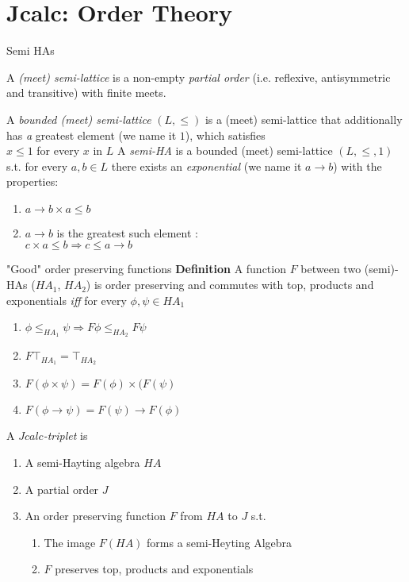 \documentclass{beamer}
\begin{document}
\section{Jcalc: Order Theory}
\begin{frame}{Semi HAs}
  \begin{outline}
  \1 A \textit{(meet) semi-lattice} is a non-empty \emph{partial order} 
  (i.e. reflexive, antisymmetric and transitive) 
  with finite meets.
  
 \1
  A \textit{bounded (meet) semi-lattice} $(L,\le)$ is a (meet) 
  semi-lattice that additionally has 
  \2 \emph a {greatest element} (we name it $1$), which satisfies\\
  $x \le 1$ for every $x$ in $L$  
 \1 A \textit{semi-HA} is a bounded (meet) semi-lattice $(L,\le, 1)$ 
 s.t. for every $a,b\in L$ there exists an \textit{exponential} 
 (we name it $a\rightarrow b$) 
 with the properties: 
 \begin{enumerate}
 \item $a\rightarrow b\times a\le b $
 \item $a\rightarrow b$ is the greatest such element : \\ $c\times a\le b \Longrightarrow c\le a\rightarrow b $
 \end{enumerate}
  \end{outline}
\end{frame}
\begin{frame}{"Good" order preserving functions}
  \textbf{Definition}
  A function $F$ between two (semi)-HAs ($HA_1$, $HA_2$)
   is order preserving
  and commutes with top, products and exponentials \emph{iff} for every 
  $\phi,\psi \in HA_1$
    \begin{enumerate}
    \item $\phi\le_{HA_1}\psi\Rightarrow F\phi\le_{HA_2}F\psi$
    \item $F\top_{HA_1} = \top_{HA_2}$ 
    \item{$F(\phi \times\psi) = F(\phi)\times(F(\psi)$} 
    \item $F(\phi\rightarrow \psi) = F(\psi)\rightarrow F(\phi)$
    \end{enumerate}
    A \emph{$Jcalc$-triplet} is 
    
  \begin{enumerate}
  \item A semi-Hayting algebra $HA$
  \item A partial order $J$
  \item An order preserving function $F$ from $HA$ to $J$ s.t.
  \begin{enumerate}
    \item The image $F(HA)$ forms a semi-Heyting Algebra
    \item $F$ preserves top, products and exponentials
  \end{enumerate}
  \end{enumerate}
\end{frame}
\end{document}
